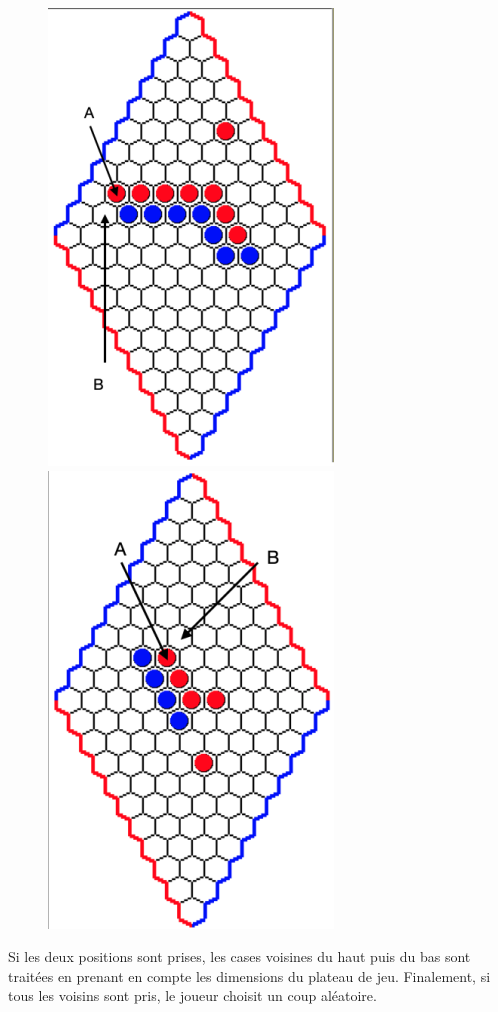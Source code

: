 \documentclass{article}
\begin{document}
\begin{figure}[H]
\centering
\includegraphics[scale=0.5]{1.png}
\includegraphics[scale=0.5]{2.png}
\end{figure}

Si les deux positions sont prises, les cases voisines du haut puis du bas sont traitées en prenant en compte les dimensions du plateau de jeu.
Finalement, si tous les voisins sont pris, le joueur choisit un coup aléatoire.
\end{document}
